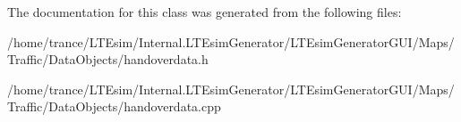 The documentation for this class was generated from the following files\+:\begin{DoxyCompactItemize}
\item 
/home/trance/\+L\+T\+Esim/\+Internal.\+L\+T\+Esim\+Generator/\+L\+T\+Esim\+Generator\+G\+U\+I/\+Maps/\+Traffic/\+Data\+Objects/handoverdata.\+h\item 
/home/trance/\+L\+T\+Esim/\+Internal.\+L\+T\+Esim\+Generator/\+L\+T\+Esim\+Generator\+G\+U\+I/\+Maps/\+Traffic/\+Data\+Objects/handoverdata.\+cpp\end{DoxyCompactItemize}
